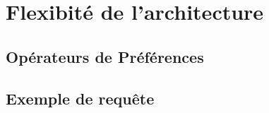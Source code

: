 \section{Flexibité de l'architecture}\label{sec:valid:domvision:architecture}
\subsection{Opérateurs de Préférences}

\subsection{Exemple de requête}